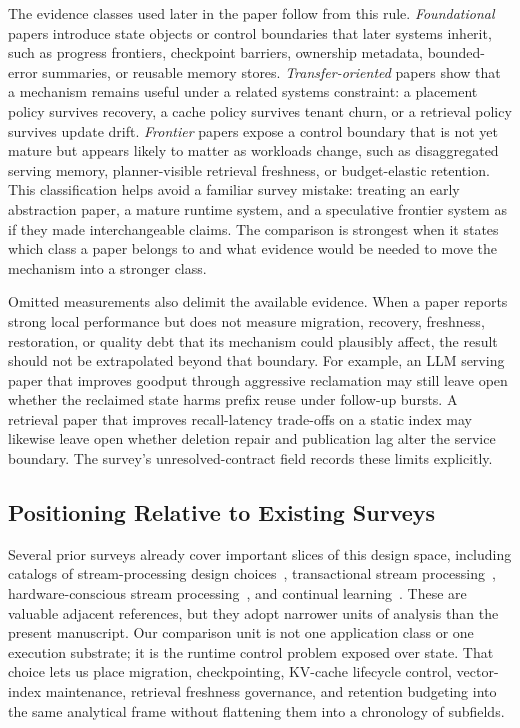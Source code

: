 \documentclass[manuscript]{acmart}
\begin{document}
The evidence classes used later in the paper follow from this rule. \emph{Foundational} papers introduce state objects or control boundaries that later systems inherit, such as progress frontiers, checkpoint barriers, ownership metadata, bounded-error summaries, or reusable memory stores. \emph{Transfer-oriented} papers show that a mechanism remains useful under a related systems constraint: a placement policy survives recovery, a cache policy survives tenant churn, or a retrieval policy survives update drift. \emph{Frontier} papers expose a control boundary that is not yet mature but appears likely to matter as workloads change, such as disaggregated serving memory, planner-visible retrieval freshness, or budget-elastic retention. This classification helps avoid a familiar survey mistake: treating an early abstraction paper, a mature runtime system, and a speculative frontier system as if they made interchangeable claims. The comparison is strongest when it states which class a paper belongs to and what evidence would be needed to move the mechanism into a stronger class.

Omitted measurements also delimit the available evidence. When a paper reports strong local performance but does not measure migration, recovery, freshness, restoration, or quality debt that its mechanism could plausibly affect, the result should not be extrapolated beyond that boundary. For example, an LLM serving paper that improves goodput through aggressive reclamation may still leave open whether the reclaimed state harms prefix reuse under follow-up bursts. A retrieval paper that improves recall-latency trade-offs on a static index may likewise leave open whether deletion repair and publication lag alter the service boundary. The survey's unresolved-contract field records these limits explicitly.

\subsection{Positioning Relative to Existing Surveys}

Several prior surveys already cover important slices of this design space, including catalogs of stream-processing design choices~\cite{hirzel2014catalog,cugola2012processing}, transactional stream processing~\cite{zhang2024survey}, hardware-conscious stream processing~\cite{zhang2020hardware}, and continual learning~\cite{delange2021survey}. These are valuable adjacent references, but they adopt narrower units of analysis than the present manuscript. Our comparison unit is not one application class or one execution substrate; it is the runtime control problem exposed over state. That choice lets us place migration, checkpointing, KV-cache lifecycle control, vector-index maintenance, retrieval freshness governance, and retention budgeting into the same analytical frame without flattening them into a chronology of subfields.
\end{document}
